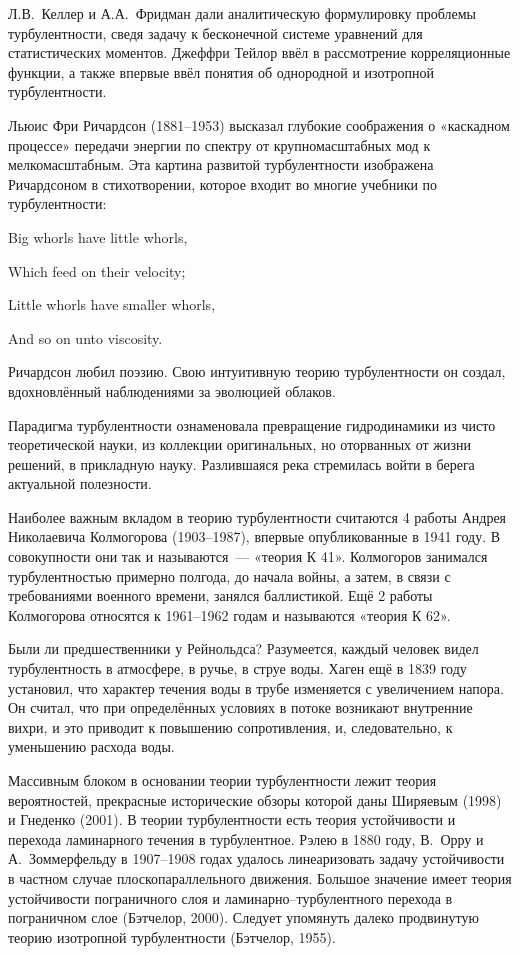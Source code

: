 Л.В.~Келлер и А.А.~Фридман дали аналитическую формулировку проблемы турбулентности, сведя задачу к 
бесконечной системе уравнений для статистических моментов. Джеффри Тейлор ввёл в рассмотрение корреляционные 
функции, а также впервые ввёл понятия об однородной и изотропной турбулентности.

Льюис Фри Ричардсон (1881--1953) высказал глубокие соображения о «каскадном процессе» передачи энергии 
по спектру от крупномасштабных мод к мелкомасштабным. Эта картина развитой турбулентности изображена 
Ричардсоном в стихотворении, которое входит во многие учебники по турбулентности:

Big whorls have little whorls,

Which feed on their velocity;

Little whorls have smaller whorls,

And so on unto viscosity.

Ричардсон любил поэзию. Свою интуитивную теорию турбулентности он создал, вдохновлённый наблюдениями 
за эволюцией облаков.

Парадигма турбулентности ознаменовала превращение гидродинамики из чисто теоретической науки, 
из коллекции оригинальных, но оторванных от жизни решений, в прикладную науку. Разлившаяся река 
стремилась войти в берега актуальной полезности.

Наиболее важным вкладом в теорию турбулентности считаются 4 работы Андрея Николаевича Колмогорова 
(1903--1987), впервые опубликованные в 1941 году. В совокупности они так и называются~--- «теория К 41». 
Колмогоров занимался турбулентностью примерно полгода, до начала войны, а затем, в связи с требованиями 
военного времени, занялся баллистикой. Ещё 2 работы Колмогорова относятся к 1961--1962 годам и называются «теория К 62».

Были ли предшественники у Рейнольдса? Разумеется, каждый человек видел турбулентность в атмосфере, 
в ручье, в струе воды. Хаген ещё в 1839 году установил, что характер течения воды в трубе изменяется 
с увеличением напора. Он считал, что при определённых условиях в потоке возникают внутренние вихри, 
и это приводит к повышению сопротивления, и, следовательно, к уменьшению расхода воды.

Массивным блоком в основании теории турбулентности лежит теория вероятностей, прекрасные исторические 
обзоры которой даны Ширяевым (1998) и Гнеденко (2001). В теории турбулентности есть теория устойчивости 
и перехода ламинарного течения в турбулентное. Рэлею в 1880 году, В.~Орру и А.~Зоммерфельду в 1907--1908 
годах удалось линеаризовать задачу устойчивости в частном случае плоскопараллельного движения. Большое 
значение имеет теория устойчивости пограничного слоя и ламинарно--турбулентного перехода в пограничном слое 
(Бэтчелор, 2000). Следует упомянуть далеко продвинутую теорию изотропной турбулентности (Бэтчелор, 1955).


